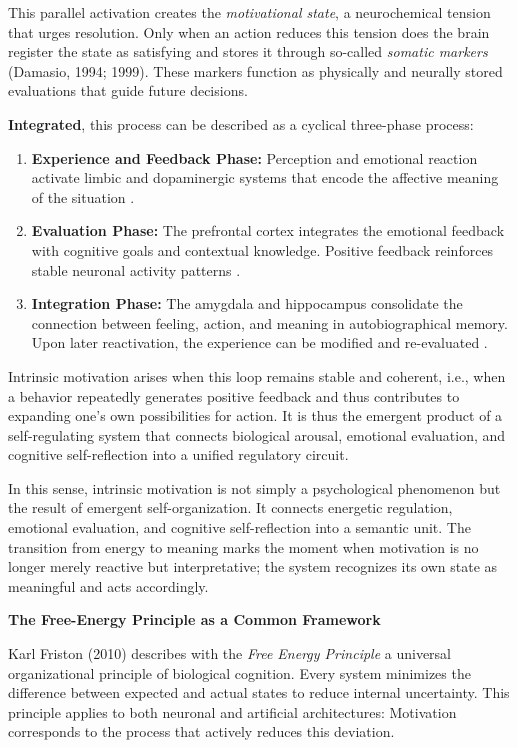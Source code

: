 This parallel activation creates the \emph{motivational state}, a neurochemical tension that urges resolution. Only when an action reduces this tension does the brain register the state as satisfying and stores it through so-called \emph{somatic markers} (Damasio, 1994; 1999). These markers function as physically and neurally stored evaluations that guide future decisions.

\textbf{Integrated}, this process can be described as a cyclical three-phase process:

\begin{enumerate}
\item \textbf{Experience and Feedback Phase:} Perception and emotional reaction activate limbic and dopaminergic systems that encode the affective meaning of the situation \cite{Schultz1997,Rolls2005}.
\item \textbf{Evaluation Phase:} The prefrontal cortex integrates the emotional feedback with cognitive goals and contextual knowledge. Positive feedback reinforces stable neuronal activity patterns \cite{Damasio1999}.
\item \textbf{Integration Phase:} The amygdala and hippocampus consolidate the connection between feeling, action, and meaning in autobiographical memory. Upon later reactivation, the experience can be modified and re-evaluated \cite{McGaugh2004,Nader2000,LeDoux1996}.
\end{enumerate}

Intrinsic motivation arises when this loop remains stable and coherent, i.e., when a behavior repeatedly generates positive feedback and thus contributes to expanding one's own possibilities for action.
It is thus the emergent product of a self-regulating system that connects biological arousal, emotional evaluation, and cognitive self-reflection into a unified regulatory circuit.

In this sense, intrinsic motivation is not simply a psychological phenomenon but the result of emergent self-organization. It connects energetic regulation, emotional evaluation, and cognitive self-reflection into a semantic unit. The transition from energy to meaning marks the moment when motivation is no longer merely reactive but interpretative; the system recognizes its own state as meaningful and acts accordingly.

\textbf{The Free-Energy Principle as a Common Framework}

Karl Friston (2010) describes with the \emph{Free Energy Principle} a universal organizational principle of biological cognition. Every system minimizes the difference between expected and actual states to reduce internal uncertainty. This principle applies to both neuronal and artificial architectures: Motivation corresponds to the process that actively reduces this deviation.

